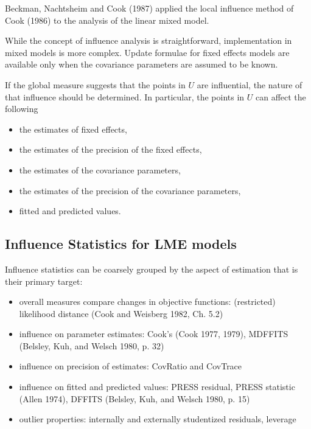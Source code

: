 \documentclass[12pt, a4paper]{article}
\begin{document}
			Beckman, Nachtsheim and Cook (1987)  applied the local influence method of Cook (1986) to the analysis of the linear mixed model.
			
			While the concept of influence analysis is straightforward, implementation in mixed models is more complex. Update formulae for fixed effects models are available only when the covariance parameters are assumed to be known.
			
			If the global measure suggests that the points in $U$ are influential, the nature of that influence should be determined. In particular, the points in $U$ can affect the following
			
			\begin{itemize}
				\item the estimates of fixed effects,
				\item the estimates of the precision of the fixed effects,
				\item the estimates of the covariance parameters,
				\item the estimates of the precision of the covariance parameters,
				\item fitted and predicted values.
			\end{itemize}
			

			
			\subsection{Influence Statistics for LME models} %
			Influence statistics can be coarsely grouped by the aspect of estimation that is their primary target:
			\begin{itemize}
				\item overall measures compare changes in objective functions: (restricted) likelihood distance (Cook and Weisberg 1982, Ch. 5.2)
				\item influence on parameter estimates: Cook's  (Cook 1977, 1979), MDFFITS (Belsley, Kuh, and Welsch 1980, p. 32)
				\item influence on precision of estimates: CovRatio and CovTrace
				\item influence on fitted and predicted values: PRESS residual, PRESS statistic (Allen 1974), DFFITS (Belsley, Kuh, and Welsch 1980, p. 15)
				\item outlier properties: internally and externally studentized residuals, leverage
			\end{itemize}
			
\end{document}
